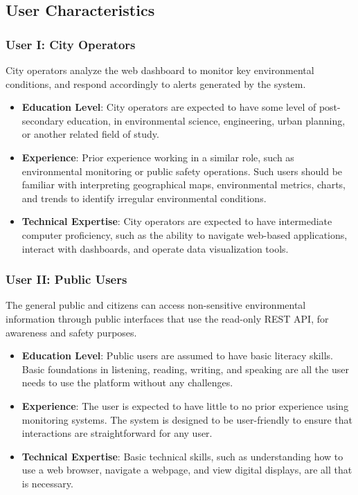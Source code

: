 \documentclass[]{article}
\begin{document}
\subsection{User Characteristics}
\label{sub:user_characteristics}

\subsubsection{User I: City Operators}
City operators analyze the web dashboard to monitor key environmental conditions, and respond accordingly to alerts generated by the system.
\begin{itemize}
    \item \textbf{Education Level}: City operators are expected to have some level of post-secondary education, in environmental science, engineering, urban planning, or another related field of study.
    \item \textbf{Experience}: Prior experience working in a similar role, such as environmental monitoring or public safety operations. Such users should be familiar with interpreting geographical maps, environmental metrics, charts, and trends to identify irregular environmental conditions.
    \item \textbf{Technical Expertise}: City operators are expected to have intermediate computer proficiency, such as the ability to navigate web-based applications, interact with dashboards, and operate data visualization tools.
\end{itemize}

\subsubsection{User II: Public Users}
The general public and citizens can access non-sensitive environmental information through public interfaces that use the read-only REST API, for awareness and safety purposes.
\begin{itemize}
    \item \textbf{Education Level}: Public users are assumed to have basic literacy skills. Basic foundations in listening, reading, writing, and speaking are all the user needs to use the platform without any challenges.
    \item \textbf{Experience}: The user is expected to have little to no prior experience using monitoring systems. The system is designed to be user-friendly to ensure that interactions are straightforward for any user.
    \item \textbf{Technical Expertise}: Basic technical skills, such as understanding how to use a web browser, navigate a webpage, and view digital displays, are all that is necessary.
\end{itemize}
\end{document}
